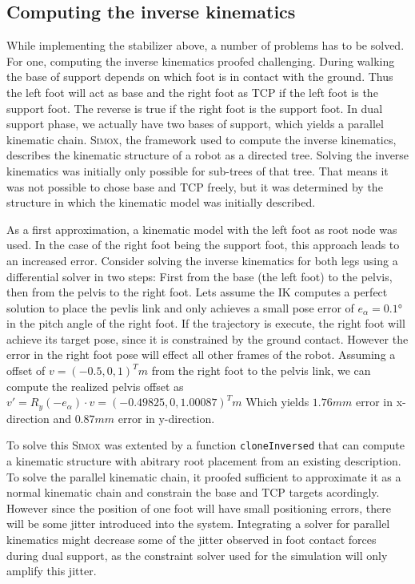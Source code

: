 \documentclass[english,ngerman]{KITreprt}
\newcommand{\fixme}[1]{{\color{red}{FIXME: #1}}}
\newcommand{\name}[1]{\textsc{#1}}
\begin{document}
\fixme{Needs introduction}

\subsection{Computing the inverse
kinematics}\label{computing-the-inverse-kinematics}

While implementing the stabilizer above, a number of problems has to be
solved. For one, computing the inverse kinematics proofed challenging.
During walking the base of support depends on which foot is in contact
with the ground. Thus the left foot will act as base and the right foot
as TCP if the left foot is the support foot. The reverse is true if the
right foot is the support foot. In dual support phase, we actually have
two bases of support, which yields a parallel kinematic chain.
\name{Simox}, the framework used to compute the inverse kinematics,
describes the kinematic structure of a robot as a directed tree. Solving
the inverse kinematics was initially only possible for sub-trees of that
tree. That means it was not possible to chose base and TCP freely, but
it was determined by the structure in which the kinematic model was
initially described.

As a first approximation, a kinematic model with the left foot as root
node was used. In the case of the right foot being the support foot,
this approach leads to an increased error. Consider solving the inverse
kinematics for both legs using a differential solver in two steps: First
from the base (the left foot) to the pelvis, then from the pelvis to the
right foot. Lets assume the IK computes a perfect solution to place the
pevlis link and only achieves a small pose error of $e_{\alpha} = 0.1°$
in the pitch angle of the right foot. If the trajectory is execute, the
right foot will achieve its target pose, since it is constrained by the
ground contact. However the error in the right foot pose will effect all
other frames of the robot. Assuming a offset of $v = (-0.5, 0, 1)^T m$
from the right foot to the pelvis link, we can compute the realized
pelvis offset as
$v' = R_y(-e_{\alpha}) \cdot v = (-0.49825, 0,  1.00087)^T m$ Which
yields $1.76mm$ error in x-direction and $0.87mm$ error in y-direction.

To solve this \name{Simox} was extented by a function
\texttt{cloneInversed} that can compute a kinematic structure with
abitrary root placement from an existing description. To solve the
parallel kinematic chain, it proofed sufficient to approximate it as a
normal kinematic chain and constrain the base and TCP targets
acordingly. However since the position of one foot will have small
positioning errors, there will be some jitter introduced into the
system. Integrating a solver for parallel kinematics might decrease some
of the jitter observed in foot contact forces during dual support, as
the constraint solver used for the simulation will only amplify this
jitter.
\end{document}
